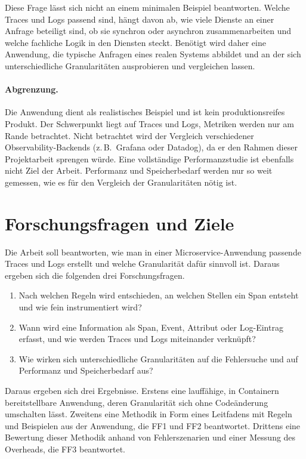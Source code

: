 \documentclass[11pt, a4paper]{article}
\begin{document}
Diese Frage lässt sich nicht an einem minimalen Beispiel beantworten. Welche Traces und Logs passend sind, hängt davon ab, wie viele Dienste an einer Anfrage beteiligt sind, ob sie synchron oder asynchron zusammenarbeiten und welche fachliche Logik in den Diensten steckt. Benötigt wird daher eine Anwendung, die typische Anfragen eines realen Systems abbildet und an der sich unterschiedliche Granularitäten ausprobieren und vergleichen lassen.

\paragraph{Abgrenzung.} Die Anwendung dient als realistisches Beispiel und ist kein produktionsreifes Produkt. Der Schwerpunkt liegt auf Traces und Logs, Metriken werden nur am Rande betrachtet. Nicht betrachtet wird der Vergleich verschiedener Observability-Backends (z.\,B.\ Grafana oder Datadog), da er den Rahmen dieser Projektarbeit sprengen würde. Eine vollständige Performanzstudie ist ebenfalls nicht Ziel der Arbeit. Performanz und Speicherbedarf werden nur so weit gemessen, wie es für den Vergleich der Granularitäten nötig ist.

\section{Forschungsfragen und Ziele}

Die Arbeit soll beantworten, wie man in einer Microservice-Anwendung passende Traces und Logs erstellt und welche Granularität dafür sinnvoll ist. Daraus ergeben sich die folgenden drei Forschungsfragen.

\begin{enumerate}[label=\textbf{FF\arabic*}, leftmargin=*, nosep]
    \item Nach welchen Regeln wird entschieden, an welchen Stellen ein Span entsteht und wie fein instrumentiert wird?
    \item Wann wird eine Information als Span, Event, Attribut oder Log-Eintrag erfasst, und wie werden Traces und Logs miteinander verknüpft?
    \item Wie wirken sich unterschiedliche Granularitäten auf die Fehlersuche und auf Performanz und Speicherbedarf aus?
\end{enumerate}

Daraus ergeben sich drei Ergebnisse. Erstens eine lauffähige, in Containern bereitstellbare Anwendung, deren Granularität sich ohne Codeänderung umschalten lässt. Zweitens eine Methodik in Form eines Leitfadens mit Regeln und Beispielen aus der Anwendung, die FF1 und FF2 beantwortet. Drittens eine Bewertung dieser Methodik anhand von Fehlerszenarien und einer Messung des Overheads, die FF3 beantwortet.
\end{document}
